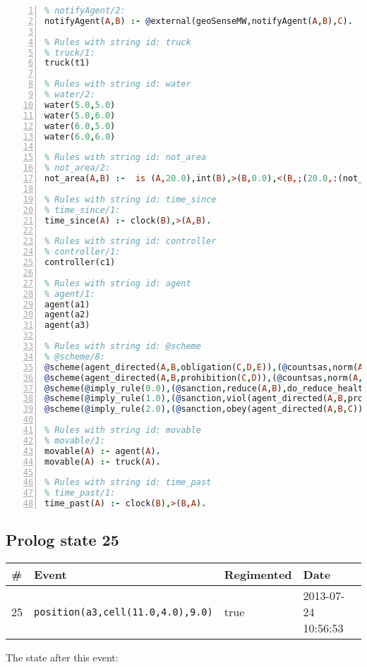 \documentclass[11pt]{article}\usepackage[utf8]{inputenc}\usepackage{geometry}
\begin{document}
\begin{lstlisting}[language=Prolog, numbers=left]
% Rules with string id: notifyAgent
% notifyAgent/2:
notifyAgent(A,B) :- @external(geoSenseMW,notifyAgent(A,B),C).

% Rules with string id: truck
% truck/1:
truck(t1)

% Rules with string id: water
% water/2:
water(5.0,5.0)
water(5.0,6.0)
water(6.0,5.0)
water(6.0,6.0)

% Rules with string id: not_area
% not_area/2:
not_area(A,B) :-  is (A,20.0),int(B),>(B,0.0),<(B,;(20.0,:(not_area(A,B), is (-(B),20.0)))),int(A),>(A,0.0),<(A,;(20.0,:(area(A,B),-(int(A))))),int(B),>(A,0.0),>(B,0.0),<(A,21.0),<(B,21.0).

% Rules with string id: time_since
% time_since/1:
time_since(A) :- clock(B),>(A,B).

% Rules with string id: controller
% controller/1:
controller(c1)

% Rules with string id: agent
% agent/1:
agent(a1)
agent(a2)
agent(a3)

% Rules with string id: @scheme
% @scheme/8:
@scheme(agent_directed(A,B,obligation(C,D,E)),(@countsas,norm(A,B,F,obligation(C,D,E)),F),false,(listTrue(C)),(time_past(D)),false,[plus(viol(agent_directed(A,B,obligation(C,D,E))))|[]],[plus(obey(agent_directed(A,B,obligation(C,D,E))))|[]])
@scheme(agent_directed(A,B,prohibition(C,D)),(@countsas,norm(A,B,E,prohibition(C,D)),E),(listTrue(C)),false,(false),false,[plus(viol(agent_directed(A,B,prohibition(C,D))))|[]],[plus(obey(agent_directed(A,B,prohibition(C,D))))|[]])
@scheme(@imply_rule(0.0),(@sanction,reduce(A,B),do_reduce_health(A,B),notifyAgent(A,changed(status))),true,false,false,false,[min(reduce(A,B))|[]],[])
@scheme(@imply_rule(1.0),(@sanction,viol(agent_directed(A,B,prohibition(C,D))),do_sanction(D)),true,false,false,false,[min(viol(agent_directed(A,B,prohibition(C,D))))|[]],[])
@scheme(@imply_rule(2.0),(@sanction,obey(agent_directed(A,B,C))),true,false,false,false,[min(obey(agent_directed(A,B,C)))|[]],[])

% Rules with string id: movable
% movable/1:
movable(A) :- agent(A).
movable(A) :- truck(A).

% Rules with string id: time_past
% time_past/1:
time_past(A) :- clock(B),>(B,A).

\end{lstlisting}
\clearpage 
\subsection{Prolog state 25}
\begin{table}[ht]
\centering 
\begin{tabular}{l l l l} 
\textbf{\#} & \textbf{Event} & \textbf{Regimented} & \textbf{Date} \\ [0.5ex] 
\hline
25&\texttt{position(a3,cell(11.0,4.0),9.0)}&true&2013-07-24 10:56:53\\ [1ex] \hline\end{tabular}
\end{table}
The state after this event:
\end{document}
